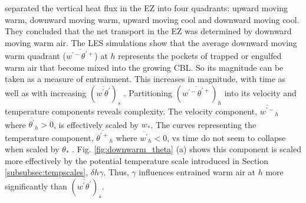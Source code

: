 \documentclass[referee]{svjour3}
\begin{document}
\cite{Sullivan98} separated the vertical heat flux in the EZ into four quadrants: upward moving warm, downward moving warm, upward moving cool and downward moving cool. They concluded that the net transport in the EZ was determined by downward moving warm air. The LES simulations show that the average downward moving warm quadrant ($\overline{w^{'-}\theta^{'+}}$) at $h$ represents the pockets of trapped or engulfed warm air that become mixed into the growing CBL.  So its magnitude can be taken as a measure of entrainment.  This increases in magnitude, with time as well as with increasing $(\overline{w^{'}\theta^{'}})_{s}$ \citep{Nchap14}.  Partitioning $(\overline{w^{'-}\theta^{'+}})_{h}$ into its velocity and temperature components reveals complexity.  The velocity component, $\overline{w^{'-}}_{h}$  where $ \overline{\theta^{'}}_{h}>0$, is effectively scaled by $w_{*}$.  The curves representing the temperature component, $\overline{\theta^{'+}}_{h}$ where $\overline{w^{'}}_{h}<0$, vs time do not seem to collapse when scaled by $\theta_{*}$ \citep{Nchap14}.  Fig. \ref{fig:downwarm_theta} (a) shows this component is scaled more effectively by the potential temperature scale introduced in Section \ref{subsubsec:tempscales}, $\delta h \gamma$.  Thus, $\gamma$ influences entrained warm air at $h$ more significantly than $(\overline{w^{'}\theta^{'}})_{s}$.\\ 
\\   
\end{document}
